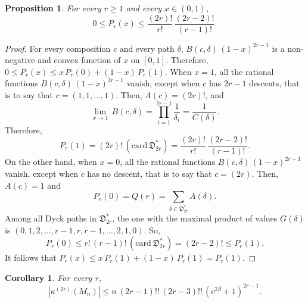 \documentclass[12pt,a4paper,reqno]{amsart}
\newcommand{\E}{\mathrm{e}}
\newcommand{\dym}{\mathfrak{D}}
\newcommand{\card}{\mathrm{card}}
\newtheorem{proposition}[theorem]{Proposition}
\newtheorem{corollary}[theorem]{Corollary}
\theoremstyle{remark}
\begin{document}
\begin{proposition}\label{prop:polynomial}
For every $r \geq 1$ and every $x \in (0,1)$, $$0 \leq P_r(x) \leq \frac{(2r)!}{r!}\,\frac{(2r-2)!}{(r-1)!}.$$
\end{proposition}

\begin{proof}For every composition $c$ and every path $\delta$, $B(c,\delta)\,(1-x)^{2r-1}$ is a non-negative and convex function of $x$ on $[0,1]$. Therefore, $0\leq P_r(x) \leq x\,P_r(0)+(1-x)\,P_r(1)$. When $x=1$, all the rational functions $B(c,\delta)\,(1-x)^{2r-1}$ vanish, except when $c$ has $2r-1$ descents, that is to say that $c=(1,1,\ldots,1)$. Then, $A(c)=(2r)!$, and
$$\lim_{x \to 1}\, B(c,\delta)= \prod_{i=1}^{2r-1} \frac{1}{\delta_i}=\frac{1}{C(\delta)}.$$
Therefore, 
$$P_r(1)=(2r)!\,(\card \,\dym_{2r}^*) = \frac{(2r)!}{r!}\,\frac{(2r-2)!}{(r-1)!}.$$
On the other hand, when $x=0$, all the rational functions $B(c,\delta)\,(1-x)^{2r-1}$ vanish, except when $c$ has no descent, that is to say that $c=(2r)$. Then, $A(c)=1$ and 
$$P_r(0)=Q(r)=\sum_{\delta \in \dym_{2r}^*}A(\delta).$$
Among all Dyck paths in $\dym_{2r}^*$, the one with the maximal product of values $G(\delta)$ is 
$(0,1,2,\ldots,r-1,r,r-1,\ldots,2,1,0)$. So,
$$
P_r(0) \leq r!\,(r-1)!\,(\card \,\dym_{2r}^*) = (2r-2 )! \leq P_r(1).
$$
It follows that $P_r(x) \leq x\,P_r(1)+(1-x)\,P_r(1)=P_r(1)$. 
\end{proof}
\bigskip

\begin{corollary}
For every $r$,
$$|\kappa^{(2r)}(M_n)|\leq n\,(2r-1)!!\,(2r-3)!! \,(\E^{2\beta}+1)^{2r-1}.$$
\end{corollary}
\end{document}
